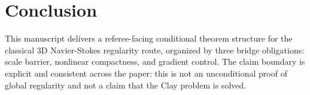 \section{Conclusion}

This manuscript delivers a referee-facing conditional theorem structure for the classical 3D Navier-Stokes regularity route, organized by three bridge obligations: scale barrier, nonlinear compactness, and gradient control. The claim boundary is explicit and consistent across the paper: this is not an unconditional proof of global regularity and not a claim that the Clay problem is solved.
